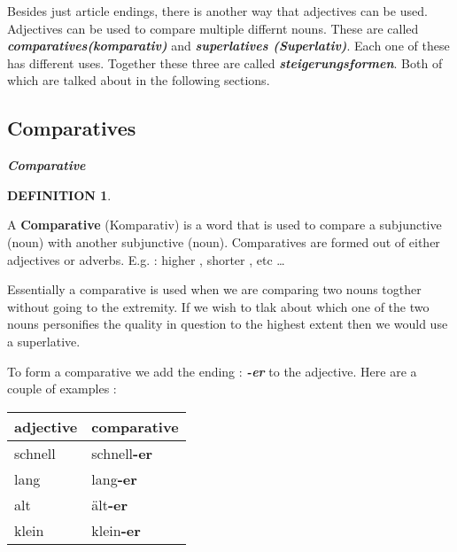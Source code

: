 \documentclass[a4paper,twocolumn,10pt]{article}
\newtheorem{mydef}{DEFINITION}[section]
\newcommand{\newpar}
{\par \vspace{0.3cm}}
\newcommand{\tcolorboxstart}
{
	\nolinenumbers
	\vspace{0.2cm}
	\centering
}
\newcommand{\tcolorboxend}
{
	\justifying
	\vspace{0.2cm}
	\linenumbers
}
\newcommand{\tcolorboxdefinition}[3]
{

\tcolorboxstart
\begin{defn-bg}

	\begin{defn-title}[width=7cm]{}
	{
		\normalsize \textbf{\textit{#1}}
	}
	\end{defn-title}

	\begin{defn-theword}
	{
		\footnotesize
		\begin{mydef} #2
		\end{mydef}
	}
	\end{defn-theword}


	\begin{defn-content}

	\justify
	#3

	\end{defn-content}

\end{defn-bg}
\tcolorboxend
}
\newcommand{\tabularxtable}[3]
{

	\vspace{0.5cm}
	\nolinenumbers

	\begin{tabularx}{#1}{#2}
		#3
	\end{tabularx}

	\linenumbers
	\vspace{0.5cm}
}
\begin{document}
Besides just article endings, there is another way that adjectives can be used.
Adjectives can be used to compare multiple differnt nouns. These are called
\textbf{\textit{comparatives(komparativ)}} and \textbf{\textit{superlatives
		(Superlativ)}}. Each one of these has different uses. Together these
three are called \textbf{\textit{steigerungsformen}}.  Both of which are talked
about in the following sections.\newpar

\subsection{Comparatives}
\label{ssec:comparatives}



\tcolorboxdefinition
{Comparative}
{\label{def:comparative}}
{

A \textbf{Comparative} (Komparativ) is a word that is used to compare a
subjunctive (noun) with another subjunctive (noun). Comparatives are formed out
of either adjectives or adverbs. E.g. : higher , shorter , etc \ldots \\

}


Essentially a comparative is used when we are comparing two nouns togther
without going to the extremity. If we wish to tlak about which one of the two
nouns personifies the quality in question to the highest extent then we would
use a superlative.

To form a comparative we add the ending : \textbf{\textit{-er}} to the
adjective. Here are a couple of examples :


\tabularxtable
{0.95\linewidth}
{XX}
{
\rowcolor{table-topic} adjective  & comparative \\

\midrule

\rowcolor{table-alternating-white} schnell &
schnell\textbf{\textcolor{green-goethe}{-er}} \\

\rowcolor{table-alternating-blue} lang  & lang\textbf{\textcolor{green-goethe}{-er}} \\

\rowcolor{table-alternating-white} alt & ält\textbf{\textcolor{green-goethe}{-er}} \\

\rowcolor{table-alternating-blue} klein  &
klein\textbf{\textcolor{green-goethe}{-er}} \\



}
\end{document}

